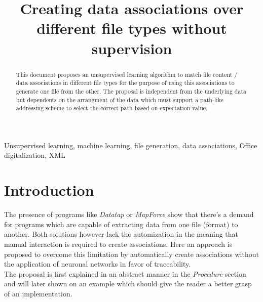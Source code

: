 \documentclass[conference]{IEEEtran}
\begin{document}
\title{Creating data associations over different file types without supervision}
\author{
}

\maketitle

\begin{abstract}
This document proposes an unsupervised learning algorithm to match file content / data
associations in different file types for the purpose of using this associations to generate
one file from the other. The proposal is independent from the underlying data but
dependents on the arrangment of the data which must support a path-like addressing scheme
to select the correct path based on expectation value.
\end{abstract}

\begin{IEEEkeywords}
Unsupervised learning, machine learning, file generation, data associations, Office
digitalization, XML
\end{IEEEkeywords}

\section{Introduction}
The presence of programs like \textit{Datatap} \cite{adverity:adverity} or \textit{MapForce}
\cite{altova:mapforce} show that there's a demand for programs which are capable of extracting
data from one file (format) to another. Both solutions however lack the automization in the
meaning that manual interaction is required to create associations. Here an approach is proposed
to overcome this limitation by automatically create associations without the application of
neuronal networks in favor of traceability.\\
The proposal is first explained in an abstract manner in the \textit{Procedure}-section and
will later shown on an example which should give the reader a better grasp of an
implementation.
\end{document}
